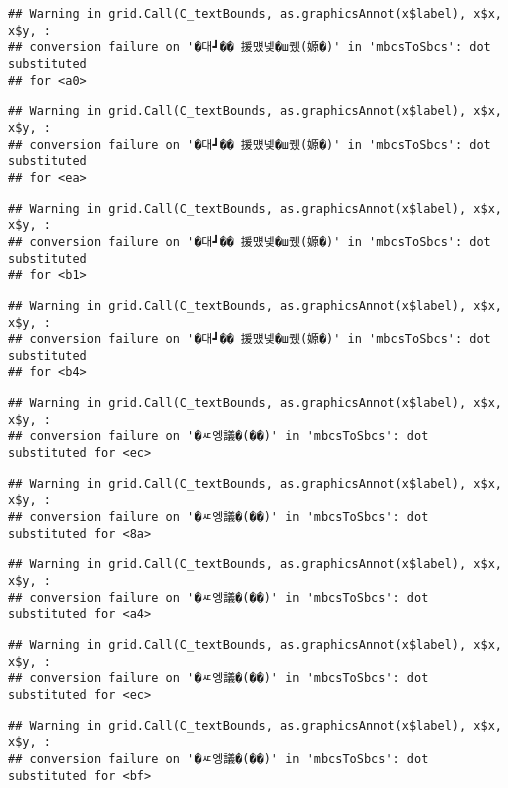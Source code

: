 \documentclass[
]{article}
\begin{document}
\begin{verbatim}
## Warning in grid.Call(C_textBounds, as.graphicsAnnot(x$label), x$x, x$y, :
## conversion failure on '�대┛�� 援먰넻�ш퀬(嫄�)' in 'mbcsToSbcs': dot substituted
## for <a0>
\end{verbatim}

\begin{verbatim}
## Warning in grid.Call(C_textBounds, as.graphicsAnnot(x$label), x$x, x$y, :
## conversion failure on '�대┛�� 援먰넻�ш퀬(嫄�)' in 'mbcsToSbcs': dot substituted
## for <ea>
\end{verbatim}

\begin{verbatim}
## Warning in grid.Call(C_textBounds, as.graphicsAnnot(x$label), x$x, x$y, :
## conversion failure on '�대┛�� 援먰넻�ш퀬(嫄�)' in 'mbcsToSbcs': dot substituted
## for <b1>
\end{verbatim}

\begin{verbatim}
## Warning in grid.Call(C_textBounds, as.graphicsAnnot(x$label), x$x, x$y, :
## conversion failure on '�대┛�� 援먰넻�ш퀬(嫄�)' in 'mbcsToSbcs': dot substituted
## for <b4>
\end{verbatim}

\begin{verbatim}
## Warning in grid.Call(C_textBounds, as.graphicsAnnot(x$label), x$x, x$y, :
## conversion failure on '�ㅼ엥議�(��)' in 'mbcsToSbcs': dot substituted for <ec>
\end{verbatim}

\begin{verbatim}
## Warning in grid.Call(C_textBounds, as.graphicsAnnot(x$label), x$x, x$y, :
## conversion failure on '�ㅼ엥議�(��)' in 'mbcsToSbcs': dot substituted for <8a>
\end{verbatim}

\begin{verbatim}
## Warning in grid.Call(C_textBounds, as.graphicsAnnot(x$label), x$x, x$y, :
## conversion failure on '�ㅼ엥議�(��)' in 'mbcsToSbcs': dot substituted for <a4>
\end{verbatim}

\begin{verbatim}
## Warning in grid.Call(C_textBounds, as.graphicsAnnot(x$label), x$x, x$y, :
## conversion failure on '�ㅼ엥議�(��)' in 'mbcsToSbcs': dot substituted for <ec>
\end{verbatim}

\begin{verbatim}
## Warning in grid.Call(C_textBounds, as.graphicsAnnot(x$label), x$x, x$y, :
## conversion failure on '�ㅼ엥議�(��)' in 'mbcsToSbcs': dot substituted for <bf>
\end{verbatim}
\end{document}
